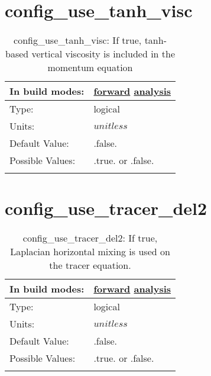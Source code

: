 \section[config\_use\_tanh\_visc]{config\_use\_tanh\_visc}
\label{sec:nm_sec_config_use_tanh_visc}
\begin{center}
\begin{longtable}{| p{2.0in} || p{4.0in} |}
    \hline
    In build modes: & \hyperref[subsec:forward_nm_tab_vmix_tanh]{forward} \hyperref[subsec:analysis_nm_tab_vmix_tanh]{analysis} \\
    \hline
    Type: & logical \\
    \hline
    Units: & $unitless$ \\
    \hline
    Default Value: & .false. \\
    \hline
    Possible Values: & .true. or .false. \\
    \hline
    \caption{config\_use\_tanh\_visc: If true, tanh-based vertical viscosity is included in the momentum equation}
\end{longtable}
\end{center}
\section[config\_use\_tracer\_del2]{config\_use\_tracer\_del2}
\label{sec:nm_sec_config_use_tracer_del2}
\begin{center}
\begin{longtable}{| p{2.0in} || p{4.0in} |}
    \hline
    In build modes: & \hyperref[subsec:forward_nm_tab_hmix_del2]{forward} \hyperref[subsec:analysis_nm_tab_hmix_del2]{analysis} \\
    \hline
    Type: & logical \\
    \hline
    Units: & $unitless$ \\
    \hline
    Default Value: & .false. \\
    \hline
    Possible Values: & .true. or .false. \\
    \hline
    \caption{config\_use\_tracer\_del2: If true, Laplacian horizontal mixing is used on the tracer equation.}
\end{longtable}
\end{center}
